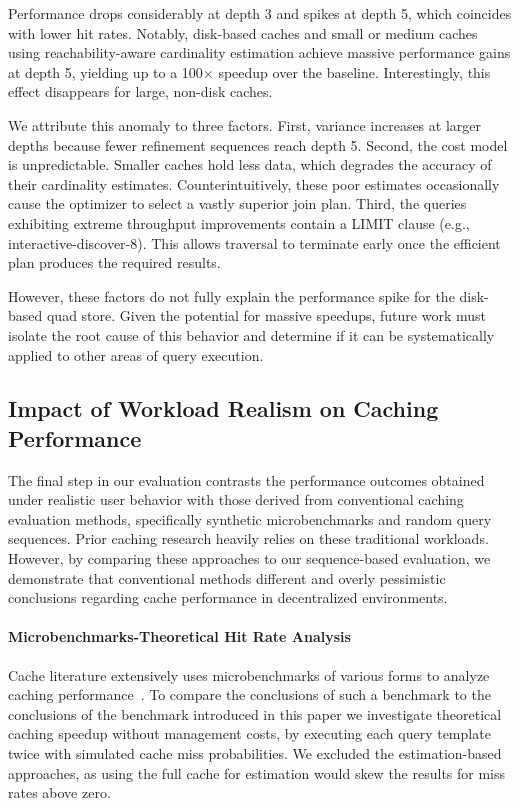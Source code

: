 Performance drops considerably at depth 3 and spikes at depth 5, which coincides with lower hit rates.
Notably, disk-based caches and small or medium caches using reachability-aware cardinality estimation 
achieve massive performance gains at depth 5, yielding up to a 100$\times$ speedup over the baseline.
Interestingly, this effect disappears for large, non-disk caches.

We attribute this anomaly to three factors. 
First, variance increases at larger depths because fewer refinement sequences reach depth 5. 
Second, the cost model is unpredictable. Smaller caches hold less data, which degrades the accuracy of their cardinality estimates.
Counterintuitively, these poor estimates occasionally cause the optimizer to select a vastly superior join plan. 
Third, the queries exhibiting extreme throughput improvements contain a LIMIT clause (e.g., interactive-discover-8). 
This allows traversal to terminate early once the efficient plan produces the required results.

However, these factors do not fully explain the performance spike for the disk-based quad store. 
Given the potential for massive speedups, future work must isolate the root cause of this behavior 
and determine if it can be systematically applied to other areas of query execution.

\subsection{Impact of Workload Realism on Caching Performance}

The final step in our evaluation contrasts the performance outcomes obtained under realistic user behavior with those derived
from conventional caching evaluation methods, specifically synthetic microbenchmarks and random query sequences. 
Prior caching research heavily relies on these traditional workloads. 
However, by comparing these approaches to our sequence-based evaluation, 
we demonstrate that conventional methods different and overly pessimistic conclusions regarding cache performance 
in decentralized environments. 

\paragraph{Microbenchmarks-Theoretical Hit Rate Analysis}
Cache literature extensively uses microbenchmarks of various forms
to analyze caching performance~\cite{nicholson2024hpcache,hartig2011caching}.
To compare the conclusions of such a benchmark to the conclusions of the benchmark introduced in this paper
we investigate theoretical caching speedup without management costs, 
by executing each query template twice with simulated cache miss probabilities. 
We excluded the estimation-based approaches,
as using the full cache for estimation would skew the results for miss rates above zero.


